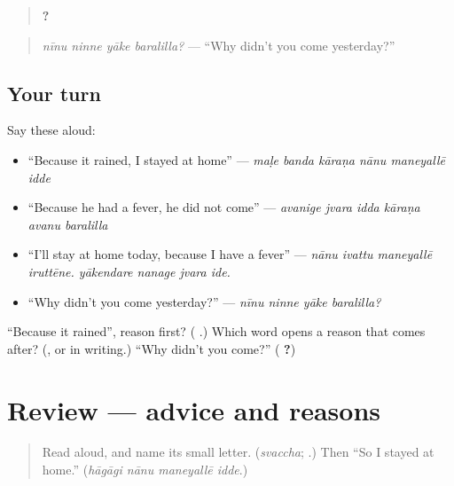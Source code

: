 \begin{quote}
\textbf{   ?}
\end{quote}

\begin{quote}
\emph{nīnu ninne yāke baralilla?} — \textquotedblleft{}Why didn't you come yesterday?\textquotedblright{}
\end{quote}

\subsection*{Your turn}
Say these aloud:

\begin{itemize}
\raggedright
  \item \textquotedblleft{}Because it rained, I stayed at home\textquotedblright{} — \emph{maḷe banda kāraṇa nānu maneyallē idde}
  \item \textquotedblleft{}Because he had a fever, he did not come\textquotedblright{} — \emph{avanige jvara idda kāraṇa avanu baralilla}
  \item \textquotedblleft{}I'll stay at home today, because I have a fever\textquotedblright{} — \emph{nānu ivattu maneyallē iruttēne. yākendare nanage jvara ide.}
  \item \textquotedblleft{}Why didn't you come yesterday?\textquotedblright{} — \emph{nīnu ninne yāke baralilla?}
\end{itemize}

\begin{tcolorbox}[breakable,colback=teal!4,colframe=teal!35!black,title={Before you move on}]
\textquotedblleft{}Because it rained\textquotedblright{}, reason first? (\textbf{  }.) Which word opens a reason that comes after? (\textbf{}, or \textbf{} in writing.) \textquotedblleft{}Why didn't you come?\textquotedblright{} (\textbf{ ?})
\end{tcolorbox}
\section[(review)]{Review — advice and reasons}

\label{lesson:KA-R312-advice-and-reasons}



\begin{quote}
Read \textbf{} aloud, and name its small letter. (\emph{svaccha}; \textbf{}.) Then \textquotedblleft{}So I stayed at home.\textquotedblright{} (\emph{hāgāgi nānu maneyallē idde}.)
\end{quote}

